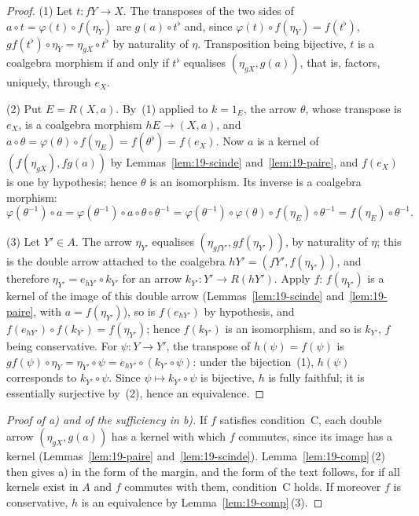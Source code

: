 \documentclass[11pt]{article}
\theoremstyle{plain}
\theoremstyle{definition}
\theoremstyle{remark}
\begin{document}
\begin{proof}
(1) Let $t : fY \to X$. The transposes of the two sides of $a \circ t = \varphi(t) \circ f(\eta_Y)$ are $g(a) \circ t^\flat$ and, since $\varphi(t) \circ f(\eta_Y) = f(t^\flat)$, $gf(t^\flat) \circ \eta_Y = \eta_{gX} \circ t^\flat$ by naturality of $\eta$. Transposition being bijective, $t$ is a coalgebra morphism if and only if $t^\flat$ equalises $(\eta_{gX}, g(a))$, that is, factors, uniquely, through $e_X$.

(2) Put $E = R(X, a)$. By~(1) applied to $k = 1_E$, the arrow $\theta$, whose transpose is $e_X$, is a coalgebra morphism $hE \to (X, a)$, and $a \circ \theta = \varphi(\theta) \circ f(\eta_E) = f(\theta^\flat) = f(e_X)$. Now $a$ is a kernel of $(f(\eta_{gX}), fg(a))$ by Lemmas~\ref{lem:19-scinde} and~\ref{lem:19-paire}, and $f(e_X)$ is one by hypothesis; hence $\theta$ is an isomorphism. Its inverse is a coalgebra morphism:
\[
\varphi(\theta^{-1}) \circ a = \varphi(\theta^{-1}) \circ a \circ \theta \circ \theta^{-1} = \varphi(\theta^{-1}) \circ \varphi(\theta) \circ f(\eta_E) \circ \theta^{-1} = f(\eta_E) \circ \theta^{-1}.
\]

(3) Let $Y' \in A$. The arrow $\eta_{Y'}$ equalises $(\eta_{gfY'}, gf(\eta_{Y'}))$, by naturality of $\eta$; this is the double arrow attached to the coalgebra $hY' = (fY', f(\eta_{Y'}))$, and therefore $\eta_{Y'} = e_{hY'} \circ k_{Y'}$ for an arrow $k_{Y'} : Y' \to R(hY')$. Apply $f$: $f(\eta_{Y'})$ is a kernel of the image of this double arrow (Lemmas~\ref{lem:19-scinde} and~\ref{lem:19-paire}, with $a = f(\eta_{Y'})$), so is $f(e_{hY'})$ by hypothesis, and $f(e_{hY'}) \circ f(k_{Y'}) = f(\eta_{Y'})$; hence $f(k_{Y'})$ is an isomorphism, and so is $k_{Y'}$, $f$ being conservative. For $\psi : Y \to Y'$, the transpose of $h(\psi) = f(\psi)$ is $gf(\psi) \circ \eta_Y = \eta_{Y'} \circ \psi = e_{hY'} \circ (k_{Y'} \circ \psi)$: under the bijection~(1), $h(\psi)$ corresponds to $k_{Y'} \circ \psi$. Since $\psi \mapsto k_{Y'} \circ \psi$ is bijective, $h$ is fully faithful; it is essentially surjective by~(2), hence an equivalence.
\end{proof}

\begin{proof}[Proof of a) and of the sufficiency in b)]
If $f$ satisfies condition~C, each double arrow $(\eta_{gX}, g(a))$ has a kernel with which $f$ commutes, since its image has a kernel (Lemmas~\ref{lem:19-paire} and~\ref{lem:19-scinde}). Lemma~\ref{lem:19-comp}\,(2) then gives a) in the form of the margin, and the form of the text follows, for if all kernels exist in $A$ and $f$ commutes with them, condition~C holds. If moreover $f$ is conservative, $h$ is an equivalence by Lemma~\ref{lem:19-comp}\,(3).
\end{proof}
\end{document}
